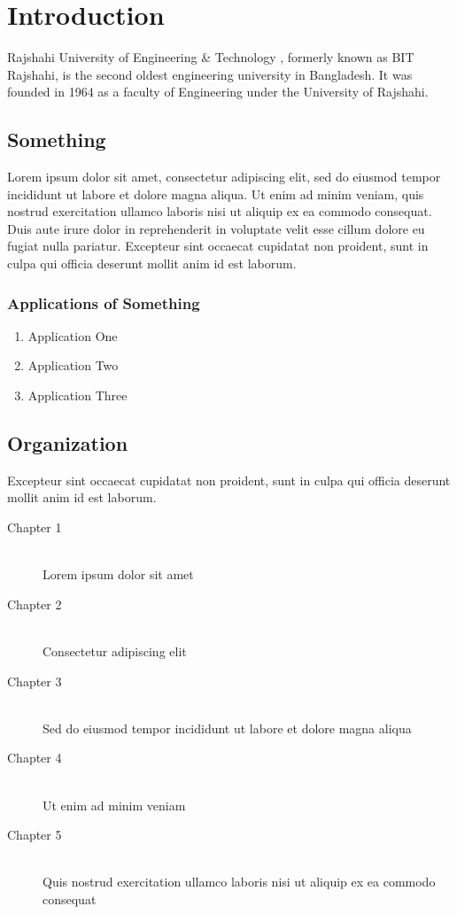 \documentclass[document.tex]{subfiles}
\begin{document}
\chapter{Introduction}
\noindent Rajshahi University of Engineering \& Technology \cite{ruetwebsite}, formerly known as BIT Rajshahi, is the second oldest engineering university in Bangladesh. It was founded in 1964 as a faculty of Engineering under the University of Rajshahi.

\section{Something}
\noindent Lorem ipsum \cite{awesome2016} dolor sit amet, consectetur adipiscing elit, sed do eiusmod tempor incididunt ut labore et dolore magna aliqua. Ut enim ad minim veniam, quis nostrud exercitation ullamco laboris nisi ut aliquip ex ea commodo consequat. Duis aute irure dolor in reprehenderit in voluptate velit esse cillum dolore eu fugiat nulla pariatur. Excepteur sint occaecat cupidatat non proident, sunt in culpa qui officia deserunt mollit anim id est laborum.

\subsection{Applications of Something}

\begin{enumerate}
        \item Application One
        \item Application Two
        \item Application Three
\end{enumerate}

\section{Organization}
Excepteur sint occaecat cupidatat non proident, sunt in culpa qui officia deserunt mollit anim id est laborum.

\begin{description}
        \item[Chapter 1] \hfill \\
        Lorem ipsum dolor sit amet
        \item[Chapter 2] \hfill \\
        Consectetur adipiscing elit
        \item[Chapter 3] \hfill \\
        Sed do eiusmod tempor incididunt ut labore et dolore magna aliqua
        \item[Chapter 4] \hfill \\
        Ut enim ad minim veniam
        \item[Chapter 5] \hfill \\
        Quis nostrud exercitation ullamco laboris nisi ut aliquip ex ea commodo consequat
\end{description}
\end{document}
